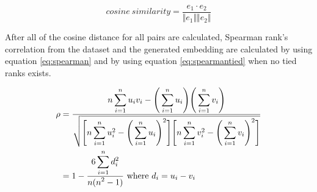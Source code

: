         \begin{equation}
            \label{eq:cosinesim}
            cosine\ similarity = \frac{e_1 \cdot e_2}{\Vert e_1 \Vert \Vert e_2 \Vert}
        \end{equation}

        After all of the cosine distance for all pairs are calculated,
        Spearman rank's correlation from the dataset and the generated
        embedding are calculated by using equation \ref{eq:spearman}
        and by using equation \ref{eq:spearmantied} when no tied ranks
        exists.
        
        \begin{align}
            \label{eq:spearman}
            \rho    &= \frac{\displaystyle n\sum_{i=1}^n u_i v_i - \Bigg( \sum_{i=1}^n u_i \Bigg) \Bigg( \sum_{i=1}^n v_i \Bigg)}{\displaystyle \sqrt{\Bigg[ n \sum_{i=1}^n u_i^2 - \Bigg( \sum_{i=1}^n u_i \Bigg)^2 \Bigg] \Bigg[ n \sum_{i=1}^n v_i^2 - \Bigg( \sum_{i=1}^n v_i \Bigg)^2 \Bigg] }}\\
            \label{eq:spearmantied}            
                    &= 1 - \frac{\displaystyle 6 \sum_{i=1}^n d_i^2}{\displaystyle n(n^2 - 1)}\ \text{where}\ d_i = u_i - v_i
        \end{align}
